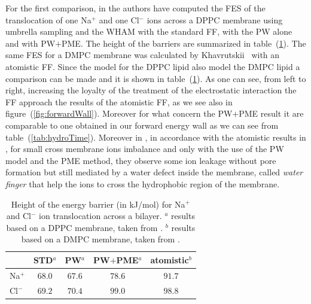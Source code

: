 For the first comparison, in \cite{PW} the authors have computed the \ac{FES} of the translocation of one Na$^+$ and one Cl$^-$ ions across a \acs{DPPC} membrane using umbrella sampling and the \ac{WHAM} with the standard \martini \ac{FF}, with the \ac{PW} alone and with \ac{PW}$+$\ac{PME}. The height of the barriers are summarized in table~(\ref{tab:ionTranslocation}). The same \ac{FES} for a \acs{DMPC} membrane was calculated by Khavrutskii \etal\, \cite{atomisticTranslocation} with an atomistic \ac{FF}. Since the \martini model for the \acs{DPPC} lipid also model the \acs{DMPC} lipid a comparison can be made and it is shown in table~(\ref{tab:ionTranslocation}). As one can see, from left to right, increasing the loyalty of the treatment of the electrostatic interaction the \martini \ac{FF} approach the results of the atomistic \ac{FF}, as we see also in figure~(\ref{fig:forwardWall}). Moreover for what concern the \ac{PW}$+$\ac{PME} result it are comparable to one obtained in our forward energy wall as we can see from table~(\ref{tab:hydroTime}). Moreover in \cite{PW}, in accordance with the atomistic results in \cite{atomisticTranslocation}, for small cross membrane ions imbalance and only with the use of the \ac{PW} model and the \ac{PME} method, they observe some ion leakage without pore formation but still mediated by a water defect inside the membrane, called \textit{water finger} that help the ions to cross the hydrophobic region of the membrane.
\begin{table}[h!t]
	\centering
	\begin{tabular}{lcccc}
		\toprule	
		\,		& STD$^a$ 	& \acs{PW}$^a$ 	& \acs{PW}$+$\acs{PME}$^a$ 	& atomistic$^b$	\\ \toprule
		Na$^+$	& $68.0$& $67.6$	& $78.6$				& $91.7$ 	\\ \midrule
		Cl$^-$	& $69.2$& $70.4$	& $99.0$				& $98.8$	\\ \bottomrule
	\end{tabular}
	\caption{Height of the energy barrier (in kJ/mol) for Na$^+$ and Cl$^-$ ion translocation across a bilayer. $^a$ results based on a \acs{DPPC} membrane, taken from \cite{PW}. $^b$ results based on a \acs{DMPC} membrane, taken from \cite{atomisticTranslocation}.}
	\label{tab:ionTranslocation}
\end{table}

